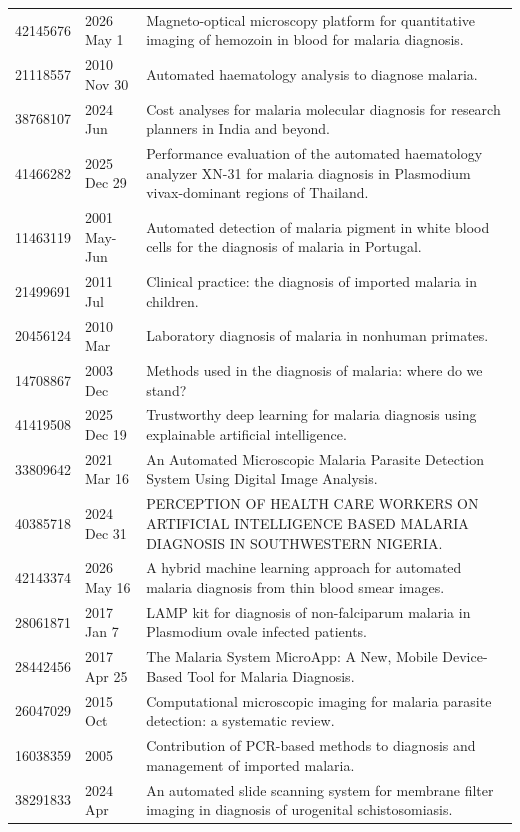 \begin{longtable}{llp{9.5cm}}
42145676 & 2026 May 1 & Magneto-optical microscopy platform for quantitative imaging of hemozoin in blood for malaria diagnosis. \\
21118557 & 2010 Nov 30 & Automated haematology analysis to diagnose malaria. \\
38768107 & 2024 Jun & Cost analyses for malaria molecular diagnosis for research planners in India and beyond. \\
41466282 & 2025 Dec 29 & Performance evaluation of the automated haematology analyzer XN-31 for malaria diagnosis in Plasmodium vivax-dominant regions of Thailand. \\
11463119 & 2001 May-Jun & Automated detection of malaria pigment in white blood cells for the diagnosis of malaria in Portugal. \\
21499691 & 2011 Jul & Clinical practice: the diagnosis of imported malaria in children. \\
20456124 & 2010 Mar & Laboratory diagnosis of malaria in nonhuman primates. \\
14708867 & 2003 Dec & Methods used in the diagnosis of malaria: where do we stand? \\
41419508 & 2025 Dec 19 & Trustworthy deep learning for malaria diagnosis using explainable artificial intelligence. \\
33809642 & 2021 Mar 16 & An Automated Microscopic Malaria Parasite Detection System Using Digital Image Analysis. \\
40385718 & 2024 Dec 31 & PERCEPTION OF HEALTH CARE WORKERS ON ARTIFICIAL INTELLIGENCE BASED MALARIA DIAGNOSIS IN SOUTHWESTERN NIGERIA. \\
42143374 & 2026 May 16 & A hybrid machine learning approach for automated malaria diagnosis from thin blood smear images. \\
28061871 & 2017 Jan 7 & LAMP kit for diagnosis of non-falciparum malaria in Plasmodium ovale infected patients. \\
28442456 & 2017 Apr 25 & The Malaria System MicroApp: A New, Mobile Device-Based Tool for Malaria Diagnosis. \\
26047029 & 2015 Oct & Computational microscopic imaging for malaria parasite detection: a systematic review. \\
16038359 & 2005 & Contribution of PCR-based methods to diagnosis and management of imported malaria. \\
38291833 & 2024 Apr & An automated slide scanning system for membrane filter imaging in diagnosis of urogenital schistosomiasis. \\

\end{longtable}
